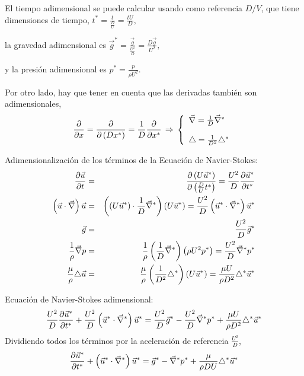 		El tiempo adimensional se puede calcular usando como referencia $D/V$,
		que tiene dimensiones de tiempo, $t^{\ast}=\frac{t}{\frac{D}{U}}=\frac{tU}{D},$ 
		
		la gravedad adimensional es $\vec{g}^{\ast}=\frac{\vec{g}}{\frac{U^{2}}{D}}=\frac{D\vec{g}}{U^{2}},$ 
		
		y la presión adimensional es $p^{\ast}=\frac{p}{\rho U^{2}}.$
		
		Por otro lado, hay que tener en cuenta que las derivadas también son
		adimensionales, 
		\[
		\frac{\partial }{\partial x}=\frac{\partial }{\partial \left(Dx^{\ast}\right)}=\frac{1}{D}\frac{\partial }{\partial x^{\ast}}\,\Rightarrow\,\left\{ \begin{array}{l}
			\vec{\nabla}=\frac{1}{D}\vec{\nabla}^{\ast}\\
			\\
			\triangle=\frac{1}{D^{2}}\triangle^{\ast}
		\end{array}\right.
		\]
		
		Adimensionalización de los términos de la Ecuación de Navier-Stokes:
		\begin{eqnarray*}
			\frac{\partial \vec{u}}{\partial t} & = & \frac{\partial \left(U\vec{u}^{\ast}\right)}{\partial \left(\frac{D}{U}t^{\ast}\right)}=\frac{U^{2}}{D}\frac{\partial \vec{u}^{\ast}}{\partial t^{\ast}}\\
			\left(\vec{u}\cdot\vec{\nabla}\right)\vec{u} & = & \left(\left(U\vec{u}^{\ast}\right)\cdot\frac{1}{D}\vec{\nabla}^{\ast}\right)\left(U\vec{u}^{\ast}\right)=\frac{U^{2}}{D}\left(\vec{u}^{\ast}\cdot\vec{\nabla}^{\ast}\right)\vec{u}^{\ast}\\
			\vec{g} & = & \frac{U^{2}}{D}\vec{g}^{\ast}\\
			\frac{1}{\rho}\vec{\nabla}p & = & \frac{1}{\rho}\left(\frac{1}{D}\vec{\nabla}^{\ast}\right)\left(\rho U^{2}p^{\ast}\right)=\frac{U^{2}}{D}\vec{\nabla}^{\ast}p^{\ast}\\
			\frac{\mu}{\rho}\triangle\vec{u} & = & \frac{\mu}{\rho}\left(\frac{1}{D^{2}}\triangle^{\ast}\right)\left(U\vec{u}^{\ast}\right)=\frac{\mu U}{\rho D^{2}}\triangle^{\ast}\vec{u}^{\ast}
		\end{eqnarray*}
		
		Ecuación de Navier-Stokes adimensional: 
		\[
		\frac{U^{2}}{D}\frac{\partial \vec{u}^{\ast}}{\partial t^{\ast}}+\frac{U^{2}}{D}\left(\vec{u}^{\ast}\cdot\vec{\nabla}^{\ast}\right)\vec{u}^{\ast}=\frac{U^{2}}{D}\vec{g}^{\ast}-\frac{U^{2}}{D}\vec{\nabla}^{\ast}p^{\ast}+\frac{\mu U}{\rho D^{2}}\triangle^{\ast}\vec{u}^{\ast}
		\]
		Dividiendo todos los términos por la aceleración de referencia $\frac{U^{2}}{D}$,
		\[
		\frac{\partial \vec{u}^{\ast}}{\partial t^{\ast}}+\left(\vec{u}^{\ast}\cdot\vec{\nabla}^{\ast}\right)\vec{u}^{\ast}=\vec{g}^{\ast}-\vec{\nabla}^{\ast}p^{\ast}+\frac{\mu}{\rho DU}\triangle^{\ast}\vec{u}^{\ast}
		\]
		
